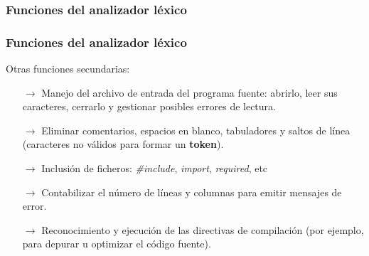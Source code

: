 \documentclass{beamer}
\begin{document}
		\begin{frame}
			\frametitle{Funciones del analizador l\'exico}

			\begin{figure}[H]
			    \begin{center}
			    \end{center}
			\end{figure}
		\end{frame}	
		
		\begin{frame}
			\frametitle{Funciones del analizador l\'exico}

			\begin{block}{Otras funciones secundarias:}
			  \begin{itemize}
			      \item[$\rightarrow$] Manejo del archivo de entrada del programa fuente: abrirlo, leer sus caracteres, cerrarlo y gestionar posibles errores de lectura.
			      \item[$\rightarrow$] Eliminar comentarios, espacios en blanco, tabuladores y saltos de l\'inea (caracteres no v\'alidos para formar un \textbf{token}).
			      \item[$\rightarrow$] Inclusi\'on de ficheros: \emph{\#include}, \emph{import}, \emph{required}, etc
			      \item[$\rightarrow$] Contabilizar el n\'umero de l\'ineas y columnas para emitir mensajes de error.
			      \item[$\rightarrow$] Reconocimiento y ejecuci\'on de las directivas de compilaci\'on (por ejemplo, para depurar u optimizar el c\'odigo fuente).
			  \end{itemize}
			\end{block}
		\end{frame}		
		
\end{document}
